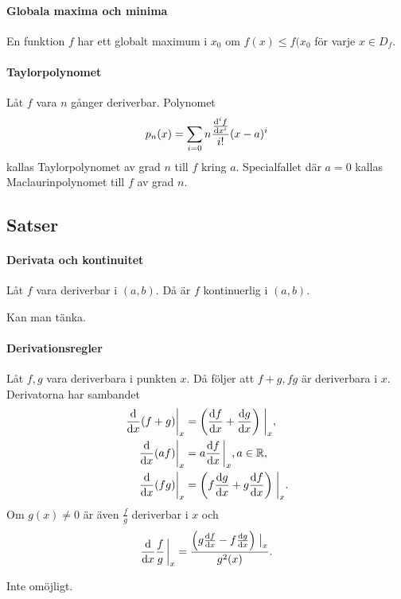 \paragraph{Globala maxima och minima}
En funktion $f$ har ett globalt maximum i $x_0$ om $f(x)\leq f(x_0$ för varje $x\in D_f$.

\paragraph{Taylorpolynomet}
Låt $f$ vara $n$ gånger deriverbar. Polynomet
\begin{align*}
	p_n(x) = \sum\limits_{i = 0}{n}\frac{\dv[i]{f}{x} (0)}{i!}(x - a)^i
\end{align*}
kallas Taylorpolynomet av grad $n$ till $f$ kring $a$. Specialfallet där $a = 0$ kallas Maclaurinpolynomet till $f$ av grad $n$.

\subsection{Satser}

\paragraph{Derivata och kontinuitet}
Låt $f$ vara deriverbar i $(a, b)$. Då är $f$ kontinuerlig i $(a, b)$.

\proof
Kan man tänka.

\paragraph{Derivationsregler}
Låt $f, g$ vara deriverbara i punkten $x$. Då följer att $f + g, fg$ är deriverbara i $x$. Derivatorna har sambandet
\begin{align*}
	\eval{\dv{x}(f + g)}_x &= \left(\dv{f}{x} + \dv{g}{x}\right)\eval_x, \\
	\eval{\dv{x}(af)}_x    &= a\dv{f}{x}\eval_x, a\in\R, \\
	\eval{\dv{x}(fg)}_x    &= \left(f\dv{g}{x} + g\dv{f}{x}\right)\eval_x. \\
\end{align*}
Om $g(x)\neq 0$ är även $\frac{f}{g}$ deriverbar i $x$ och
\begin{align*}
	\dv{x}\frac{f}{g}\eval_x = \frac{\left(g\dv{f}{x} - f\dv{g}{x}\right)\eval_x}{g^2(x)}.
\end{align*}

\proof
Inte omöjligt.

